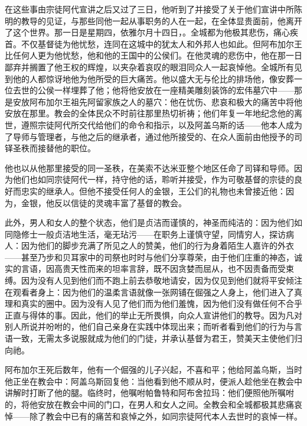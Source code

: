 在这些事由宗徒阿代宣讲之后又过了三日，他听到了并接受了关于他们宣讲中所陈明的教导的见证，与那些同他一起从事职务的人在一起，在全体显贵面前，他离开了这个世界。那一日是星期四，依雅尔月十四日，。全城都为他极其悲伤，痛心疾首。不仅基督徒为他忧愁，连同在这城中的犹太人和外邦人也如此。但阿布加尔王比任何人更为他忧愁，他和他的王国中的公侯们。在他灵魂的悲伤中，他在那一日鄙弃并搁置了他王权的辉煌，以夹杂着哀叹的眼泪同众人一起哀悼他。全城所有见到他的人都惊讶地他为他所受的巨大痛苦。他以盛大无与伦比的排场他，像安葬一位去世的公侯一样埋葬了他；他将他安放在一座精美雕刻装饰的宏伟墓穴中——那是安放阿布加尔王祖先阿留家族之人的墓穴：他在忧伤、悲哀和极大的痛苦中将他安放在那里。教会的全体民众不时前往那里热切祈祷；他们年复一年地纪念他的离世，遵照宗徒阿代所交代给他们的命令和指示，以及阿盖乌斯的话——他本人成为了导师与管理者，与他之后的继承者，通过他所接受的、在众人面前由他授予的司铎圣秩而接替他的职位。\par

他也以从他那里接受的同一圣秩，在美索不达米亚整个地区任命了司铎和导师。因为他们也如同宗徒阿代一样，持守他的话，聆听并接受，作为可敬基督的宗徒的良好而忠实的继承人。但他不接受任何人的金银，王公们的礼物也未曾接近他：因为，金银，他反以信徒的灵魂丰富了基督的教会。\par

此外，男人和女人的整个状态，他们是贞洁而谨慎的，神圣而纯洁的：因为他们如同隐修士一般贞洁地生活，毫无玷污——在职务上谨慎守望，同情穷人，探访病人：因为他们的脚步充满了所见之人的赞美，他们的行为身着陌生人嘉许的外衣——甚至乃步和贝耳家中的司祭也时时与他们分享尊荣，由于他们庄重的神态，诚实的言语，因高贵天性而来的坦率言辞，既不因贪婪而屈从，也不因责备而受束缚。因为没有人见到他们而不跑上前去恭敬地请安，因为仅见到他们就将平安倾注在观看者身上：因为他们的温柔言语就像一张网铺在倔强之人身上，他们进入了真理和真实的圈中。因为没有人见了他们而为他们羞愧，因为他们没有做任何不合乎正直与得体的事。因此，他们的举止无所畏惧，向众人宣讲他们的教导。因为凡对别人所说并吩咐的，他们自己亲身在实践中体现出来；而听者看到他们的行为与言语一致，无需太多说服就成为他们的门徒，并承认基督为君王，赞美天主使他们归向祂。\par

阿布加尔王死后数年，他有一个倔强的儿子兴起，不喜和平；他给阿盖乌斯，当时他正坐在教会中：阿盖乌斯回复他：当他看到他不顺从时，便派人趁他坐在教会中讲解时打断了他的腿。临终时，他嘱咐帕鲁特和阿布舍拉玛：他们便照他所嘱咐的，将他安放在教会中间的门口，在男人和女人之间。全教会和全城都极其悲痛哀悼——除了教会中已有的痛苦和哀悼之外，如同宗徒阿代本人去世时的哀悼一样。\par

